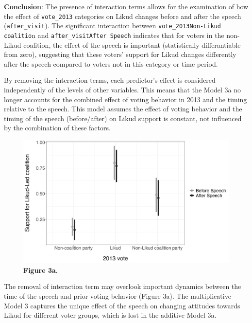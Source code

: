 \documentclass[12pt,letterpaper]{article}
\begin{document}
	\noindent \textbf{Conclusion}: The presence of interaction terms allows for the examination of how the effect of \texttt{vote\_2013} categories on Likud changes before and after the speech (\texttt{after\_visit}). The significant interaction between \texttt{vote\_2013Non-Likud coalitio}n and \texttt{after\_visitAfter Speech} indicates that for voters in the non-Likud coalition, the effect of the speech is important (statistically differantiable from zero), suggesting that these voters' support for Likud changes differently after the speech compared to voters not in this category or time period.
	
			\vspace{0.2cm}
By removing the interaction terms, each predictor's effect is considered independently of the levels of other variables. This means that the Model 3a no longer accounts for the combined effect of voting behavior in 2013 and the timing relative to the speech. This model assumes the effect of voting behavior and the timing of the speech (before/after) on Likud support is constant, not influenced by the combination of these factors.
	
			\vspace{0.2cm}
	\begin{figure}[H]
		\centering
		\includegraphics[width=1.0\textwidth]{figures_rep/Figure3a.png}
		\label{fig:your_figure_label} 
		\textbf{Figure 3a.}
		\label{fig:figure4}
	\end{figure}
	
The removal of interaction term may overlook important dynamics between the time of the speech and prior voting behavior (Figure 3a). The multiplicative Model 3 captures the unique effect of the speech on changing attitudes towards Likud for different voter groups, which is lost in the additive Model 3a.
\end{document}
